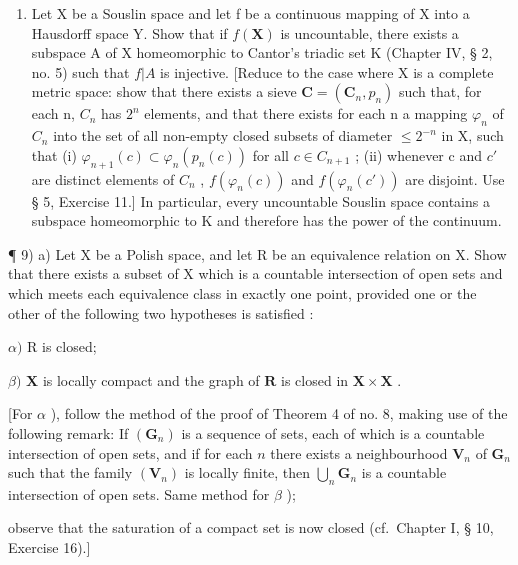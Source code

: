 \begin{enumerate}
\def\labelenumi{\arabic{enumi})}
\setcounter{enumi}{7}
\tightlist
\item
  Let X be a Souslin space and let f be a continuous mapping of X into a Hausdorff space Y. Show that if \(f(\mathbf{X})\) is uncountable, there exists a subspace A of X homeomorphic to Cantor's triadic set K (Chapter IV, § 2, no. 5) such that \(f|A\) is injective. {[}Reduce to the case where X is a complete metric space: show that there exists a sieve \(\mathbf{C} = (\mathbf{C}_{n}, p_{n})\) such that, for each n, \(C_{n}\) has \(2^{n}\) elements, and that there exists for each n a mapping \(\varphi_{n}\) of \(C_{n}\) into the set of all non-empty closed subsets of diameter \(\leqslant 2^{-n}\) in X, such that (i) \(\varphi_{n+1}(c) \subset \varphi_{n}(p_{n}(c))\) for all \(c \in C_{n+1}\) ; (ii) whenever c and \(c'\) are distinct elements of \(C_{n}\) , \(f(\varphi_{n}(c))\) and \(f(\varphi_{n}(c'))\) are disjoint. Use § 5, Exercise 11.{]} In particular, every uncountable Souslin space contains a subspace homeomorphic to K and therefore has the power of the continuum.
\end{enumerate}

¶ 9) a) Let X be a Polish space, and let R be an equivalence relation on X. Show that there exists a subset of X which is a countable intersection of open sets and which meets each equivalence class in exactly one point, provided one or the other of the following two hypotheses is satisfied :

\(\alpha)\) R is closed;

\(\beta)\) \(\mathbf{X}\) is locally compact and the graph of \(\mathbf{R}\) is closed in \(\mathbf{X} \times \mathbf{X}\) .

{[}For \(\alpha\) ), follow the method of the proof of Theorem 4 of no. 8, making use of the following remark: If \((\mathbf{G}_n)\) is a sequence of sets, each of which is a countable intersection of open sets, and if for each \(n\) there exists a neighbourhood \(\mathbf{V}_n\) of \(\mathbf{G}_n\) such that the family \((\mathbf{V}_n)\) is locally finite, then \(\bigcup_{n} \mathbf{G}_n\) is a countable intersection of open sets. Same method for \(\beta\) );

observe that the saturation of a compact set is now closed (cf.~Chapter I, § 10, Exercise 16).{]}

